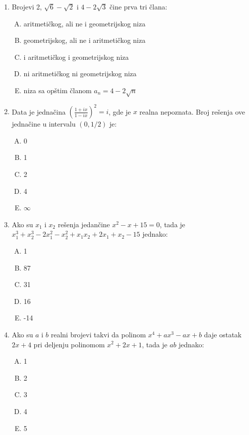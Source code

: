 \documentclass[a4paper,12pt]{report}
\begin{document}
\begin{enumerate}[1.]
\item Brojevi 2, $\sqrt{6} - \sqrt{2} $ i $4 - 2\sqrt{3}$ \v{c}ine prva tri \v{c}lana:
\begin{enumerate}[A)]
\item aritmeti\v{c}kog, ali ne i geometrijskog niza 
\item geometrijskog, ali ne i aritmeti\v{c}kog niza
\item i aritmeti\v{c}kog i geometrijskog niza
\item ni aritmeti\v{c}kog ni geometrijskog niza
\item niza sa op\v{s}tim \v{c}lanom $a_n = 4 - 2\sqrt{n} $
\end{enumerate}

\item Data je jedna\v{c}ina $\left(\frac{1 + ix}{1 - ix}\right)^2 = i $, gde je $x$ realna nepoznata. Broj re\v{s}enja ove jedna\v{c}ine u intervalu $(0,1/2)$ je:
\begin{multicols}{5}
\begin{enumerate}[A)]
\item 0 \item 1 \item 2 \item 4 \item $\infty$
\end{enumerate}
\end{multicols}

\item Ako su $x_1$ i $x_2$ re\v{s}enja jedan\v{c}ine $x^2 - x + 15 = 0$, tada je $x_1^3 + x_2^3 - 2x_1^2 - x_2^2 + x_1x_2 + 2x_1 + x_2 -15 $ jednako:
\begin{multicols}{5}
\begin{enumerate}[A)]
\item 1 \item 87 \item 31 \item 16 \item -14
\end{enumerate}
\end{multicols}

\item Ako su $a$ i $b$ realni brojevi takvi da polinom  $x^4 + ax^3 -ax +b $ daje ostatak $2x+4$  pri deljenju polinomom $x^2 + 2x+ 1$, tada je $ab$ jednako:
\begin{multicols}{5}
\begin{enumerate}[A)]
\item 1 \item 2 \item 3 \item 4 \item 5
\end{enumerate}
\end{multicols}


\end{enumerate}
\end{document}
